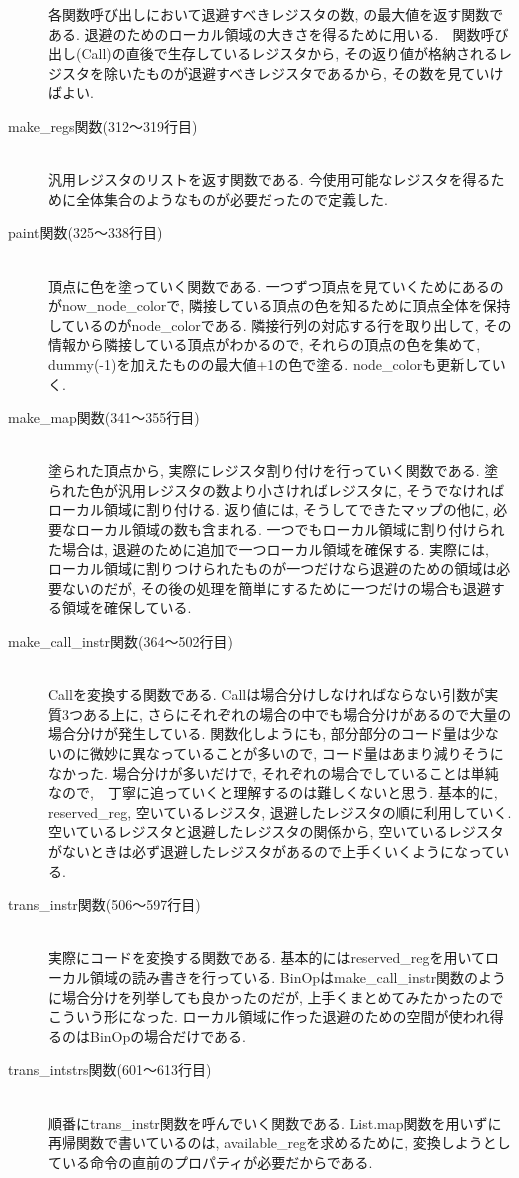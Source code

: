 \documentclass{jarticle}
\begin{document}
\begin{description}
各関数呼び出しにおいて退避すべきレジスタの数, の最大値を返す関数である. 退避のためのローカル領域の大きさを得るために用いる.　関数呼び出し(Call)の直後で生存しているレジスタから, その返り値が格納されるレジスタを除いたものが退避すべきレジスタであるから, その数を見ていけばよい.
\item[make\_regs関数(312〜319行目)] \leavevmode \\
汎用レジスタのリストを返す関数である. 今使用可能なレジスタを得るために全体集合のようなものが必要だったので定義した.
\item[paint関数(325〜338行目)] \leavevmode \\
頂点に色を塗っていく関数である. 一つずつ頂点を見ていくためにあるのがnow\_node\_colorで, 隣接している頂点の色を知るために頂点全体を保持しているのがnode\_colorである. 隣接行列の対応する行を取り出して, その情報から隣接している頂点がわかるので, それらの頂点の色を集めて, dummy(-1)を加えたものの最大値+1の色で塗る. node\_colorも更新していく.
\item[make\_map関数(341〜355行目)] \leavevmode \\
塗られた頂点から, 実際にレジスタ割り付けを行っていく関数である. 塗られた色が汎用レジスタの数より小さければレジスタに, そうでなければローカル領域に割り付ける. 返り値には, そうしてできたマップの他に, 必要なローカル領域の数も含まれる. 一つでもローカル領域に割り付けられた場合は, 退避のために追加で一つローカル領域を確保する. 実際には,　ローカル領域に割りつけられたものが一つだけなら退避のための領域は必要ないのだが, その後の処理を簡単にするために一つだけの場合も退避する領域を確保している.
\item[make\_call\_instr関数(364〜502行目)] \leavevmode \\
Callを変換する関数である. Callは場合分けしなければならない引数が実質3つある上に, さらにそれぞれの場合の中でも場合分けがあるので大量の場合分けが発生している. 関数化しようにも, 部分部分のコード量は少ないのに微妙に異なっていることが多いので, コード量はあまり減りそうになかった. 場合分けが多いだけで, それぞれの場合でしていることは単純なので,　丁寧に追っていくと理解するのは難しくないと思う. 基本的に, reserved\_reg, 空いているレジスタ, 退避したレジスタの順に利用していく. 空いているレジスタと退避したレジスタの関係から, 空いているレジスタがないときは必ず退避したレジスタがあるので上手くいくようになっている.
\item[trans\_instr関数(506〜597行目)] \leavevmode \\
実際にコードを変換する関数である. 基本的にはreserved\_regを用いてローカル領域の読み書きを行っている. BinOpはmake\_call\_instr関数のように場合分けを列挙しても良かったのだが, 上手くまとめてみたかったのでこういう形になった. ローカル領域に作った退避のための空間が使われ得るのはBinOpの場合だけである. 
\item[trans\_intstrs関数(601〜613行目)] \leavevmode \\
順番にtrans\_instr関数を呼んでいく関数である. List.map関数を用いずに再帰関数で書いているのは, available\_regを求めるために, 変換しようとしている命令の直前のプロパティが必要だからである.
\end{description}
\end{document}
